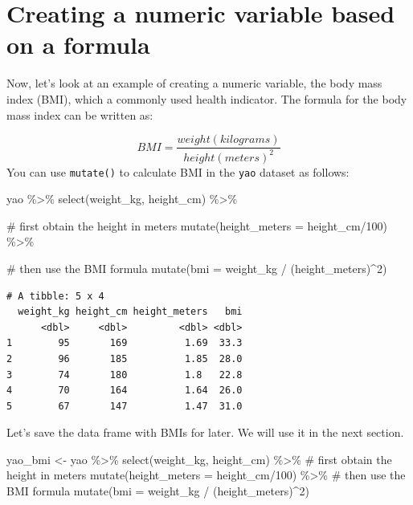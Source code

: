 \documentclass[
  letterpaper,
  DIV=11,
  numbers=noendperiod]{scrreprt}
\newenvironment{Shaded}{\begin{snugshade}}{\end{snugshade}}
\newcommand{\AttributeTok}[1]{\textcolor[rgb]{0.40,0.45,0.13}{#1}}
\newcommand{\CommentTok}[1]{\textcolor[rgb]{0.37,0.37,0.37}{#1}}
\newcommand{\DecValTok}[1]{\textcolor[rgb]{0.68,0.00,0.00}{#1}}
\newcommand{\FunctionTok}[1]{\textcolor[rgb]{0.28,0.35,0.67}{#1}}
\newcommand{\NormalTok}[1]{\textcolor[rgb]{0.00,0.23,0.31}{#1}}
\newcommand{\OtherTok}[1]{\textcolor[rgb]{0.00,0.23,0.31}{#1}}
\newcommand{\SpecialCharTok}[1]{\textcolor[rgb]{0.37,0.37,0.37}{#1}}
\begin{document}
\section{Creating a numeric variable based on a
formula}\label{creating-a-numeric-variable-based-on-a-formula}

Now, let's look at an example of creating a numeric variable, the body
mass index (BMI), which a commonly used health indicator. The formula
for the body mass index can be written as:

\[
BMI = \frac{weight (kilograms)}{height (meters)^2}
\] You can use \texttt{mutate()} to calculate BMI in the \texttt{yao}
dataset as follows:

\begin{Shaded}
\begin{Highlighting}[]
\NormalTok{yao }\SpecialCharTok{\%\textgreater{}\%}
  \FunctionTok{select}\NormalTok{(weight\_kg,  height\_cm) }\SpecialCharTok{\%\textgreater{}\%} 
  
  \CommentTok{\# first obtain the height in meters  }
  \FunctionTok{mutate}\NormalTok{(}\AttributeTok{height\_meters =}\NormalTok{ height\_cm}\SpecialCharTok{/}\DecValTok{100}\NormalTok{) }\SpecialCharTok{\%\textgreater{}\%} 
  
  \CommentTok{\# then use the BMI formula}
  \FunctionTok{mutate}\NormalTok{(}\AttributeTok{bmi =}\NormalTok{ weight\_kg }\SpecialCharTok{/}\NormalTok{ (height\_meters)}\SpecialCharTok{\^{}}\DecValTok{2}\NormalTok{)}
\end{Highlighting}
\end{Shaded}

\begin{verbatim}
# A tibble: 5 x 4
  weight_kg height_cm height_meters   bmi
      <dbl>     <dbl>         <dbl> <dbl>
1        95       169          1.69  33.3
2        96       185          1.85  28.0
3        74       180          1.8   22.8
4        70       164          1.64  26.0
5        67       147          1.47  31.0
\end{verbatim}

Let's save the data frame with BMIs for later. We will use it in the
next section.

\begin{Shaded}
\begin{Highlighting}[]
\NormalTok{yao\_bmi }\OtherTok{\textless{}{-}} 
\NormalTok{  yao }\SpecialCharTok{\%\textgreater{}\%}
  \FunctionTok{select}\NormalTok{(weight\_kg,  height\_cm) }\SpecialCharTok{\%\textgreater{}\%} 
  \CommentTok{\# first obtain the height in meters  }
  \FunctionTok{mutate}\NormalTok{(}\AttributeTok{height\_meters =}\NormalTok{ height\_cm}\SpecialCharTok{/}\DecValTok{100}\NormalTok{) }\SpecialCharTok{\%\textgreater{}\%} 
  \CommentTok{\# then use the BMI formula}
  \FunctionTok{mutate}\NormalTok{(}\AttributeTok{bmi =}\NormalTok{ weight\_kg }\SpecialCharTok{/}\NormalTok{ (height\_meters)}\SpecialCharTok{\^{}}\DecValTok{2}\NormalTok{)}
\end{Highlighting}
\end{Shaded}
\end{document}
